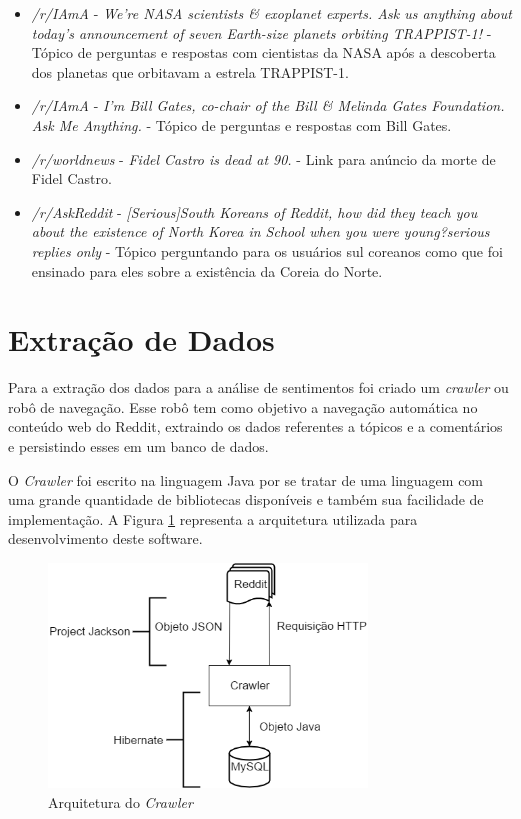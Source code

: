 \begin{itemize}
  \item \textit{/r/IAmA} - \textit{We're NASA scientists \& exoplanet experts.
  Ask us anything about today's announcement of seven Earth-size planets
  orbiting TRAPPIST-1!} - Tópico de perguntas e respostas com cientistas da
  NASA após a descoberta dos planetas que orbitavam a estrela TRAPPIST-1.
  \item \textit{/r/IAmA} - \textit{I’m Bill Gates, co-chair of the Bill \&
  Melinda Gates Foundation. Ask Me Anything.} - Tópico de perguntas e respostas com Bill Gates.
  \item \textit{/r/worldnews} - \textit{Fidel Castro is dead at 90.} - Link para
  anúncio da morte de Fidel Castro.
  \item \textit{/r/AskReddit} - \textit{[Serious]South Koreans of Reddit, how
  did they teach you about the existence of North Korea in School when you were
  young?serious replies only} - Tópico perguntando para os usuários sul coreanos
  como que foi ensinado para eles sobre a existência da Coreia do Norte.
\end{itemize}

\section{Extração de Dados}
\label{cap:Extracao}

Para a extração dos dados para a análise de sentimentos foi criado um
\textit{crawler} ou robô de navegação. Esse robô tem como objetivo a navegação
automática no conteúdo web do Reddit, extraindo os dados referentes a tópicos e
a comentários e persistindo esses em um banco de dados.

O \textit{Crawler} foi escrito na linguagem Java por se tratar de uma linguagem
com uma grande quantidade de bibliotecas disponíveis e também
sua facilidade de implementação. A Figura \ref{fig:crawler} representa a
arquitetura utilizada para desenvolvimento deste software.

\begin{figure}[htbp]
\centering
\includegraphics[height=225px]{imagens/arquitetura.png}
\caption{Arquitetura do \textit{Crawler}}
\label{fig:crawler}
\end{figure}

